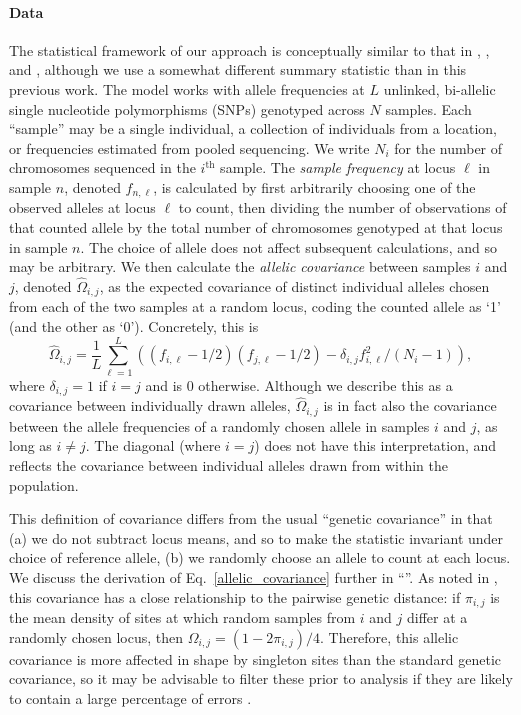 \documentclass[10pt,letterpaper]{article}
\newcommand{\secref}[1]{``\nameref{#1}''}
\begin{document}
\paragraph{Data}
The statistical framework of our approach is conceptually similar to that in \cite{Wasser2004}, \cite{BEDASSLE}, and \cite{spacemix},
although we use a somewhat different summary statistic than in this previous work.
The model works with allele frequencies at $L$ unlinked, bi-allelic single nucleotide polymorphisms (SNPs) genotyped across $N$ samples.
Each ``sample'' may be a single individual,  
a collection of individuals from a location, 
or frequencies estimated from pooled sequencing.
We write $N_i$ for the number of chromosomes sequenced in the $i^\text{th}$ sample.
The \emph{sample frequency} at locus $\ell$ in sample $n$, denoted $f_{n,\ell}$, 
is calculated by first arbitrarily choosing one of the observed alleles at locus $\ell$ to count, 
then dividing the number of observations of that counted allele by the total number of chromosomes genotyped at that locus
in sample $n$.
The choice of allele does not affect subsequent calculations, and so may be arbitrary.
We then calculate the \emph{allelic covariance} between samples $i$ and $j$, denoted $\widehat{\Omega}_{i,j}$,
as the expected covariance of distinct individual alleles 
chosen from each of the two samples at a random locus,
coding the counted allele as `1' (and the other as `0').
Concretely, this is
\begin{equation}
\widehat{\Omega}_{i,j} = 
    \frac{1}{L} \sum_{\ell=1}^L \left( (f_{i,\ell}-1/2) (f_{j,\ell}-1/2) - \delta_{i,j} f_{i,\ell}^2 / (N_i-1) \right),
\label{allelic_covariance}
\end{equation}
where $\delta_{i,j}=1$ if $i=j$ and is 0 otherwise.
Although we describe this as a covariance between individually drawn alleles,
$\widehat{\Omega}_{i,j}$ is in fact also the covariance between the allele frequencies
of a randomly chosen allele in samples $i$ and $j$, as long as $i \neq j$.
The diagonal (where $i=j$) does not have this interpretation, 
and reflects the covariance between individual alleles drawn from within the population.

This definition of covariance differs from the usual ``genetic covariance'' \cite{mcvean_genealogical_2009}
in that (a) we do not subtract locus means,
and so to make the statistic invariant under choice of reference allele, 
(b) we randomly choose an allele to count at each locus.
We discuss the derivation of Eq.\ \eqref{allelic_covariance} further in \secref{allelic_cov}.
As noted in \cite{EEMS},
this covariance has a close relationship to the pairwise genetic distance:
if $\pi_{i,j}$ is the mean density of sites at which random samples from $i$ and $j$ differ at a randomly chosen locus,
then $\Omega_{i,j} = (1 - 2 \pi_{i,j})/4$.
Therefore, 
this allelic covariance is more affected in shape by singleton sites
than the standard genetic covariance,
so it may be advisable to filter these prior to analysis
if they are likely to contain a large percentage of errors \cite{linck_battey2017}.
\end{document}
